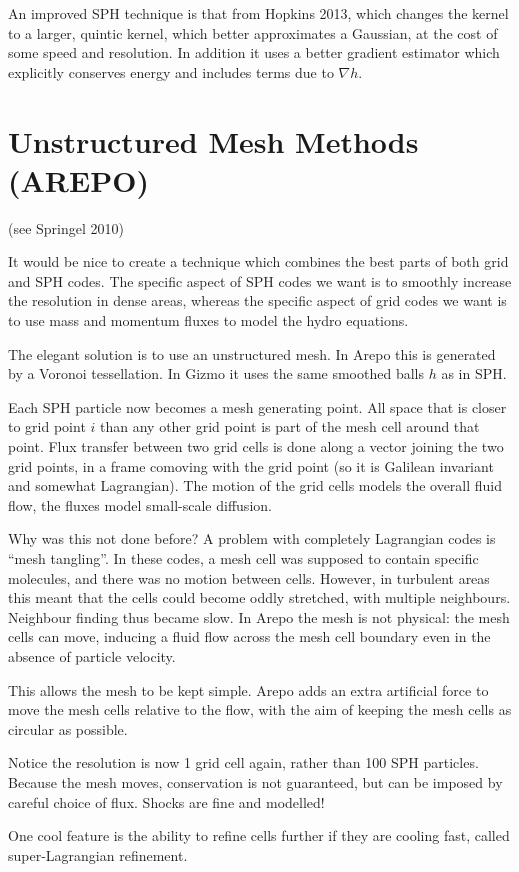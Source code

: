 \documentclass[12pt]{article}
\begin{document}
An improved SPH technique is that from Hopkins 2013, which changes the kernel to a larger, quintic kernel, which better approximates a Gaussian, at the cost of some speed and resolution. In addition it uses a better gradient estimator which explicitly conserves energy and includes terms due to $\nabla h$.

\section{Unstructured Mesh Methods (AREPO)}
(see Springel 2010)

It would be nice to create a technique which combines the best parts of both grid and SPH codes. The specific aspect of SPH codes we want is to smoothly increase the resolution in dense areas, whereas the specific aspect of grid codes we want is to use mass and momentum fluxes to model the hydro equations.

The elegant solution is to use an unstructured mesh. In Arepo this is generated by a Voronoi tessellation. In Gizmo it uses the same smoothed balls $h$ as in SPH.

Each SPH particle now becomes a mesh generating point. All space that is closer to grid point $i$ than any other grid point is part of the mesh cell around that point. Flux transfer between two grid cells is done along a vector joining the two grid points, in a frame comoving with the grid point (so it is Galilean invariant and somewhat Lagrangian).
The motion of the grid cells models the overall fluid flow, the fluxes model small-scale diffusion.

Why was this not done before? A problem with completely Lagrangian codes is ``mesh tangling''. In these codes, a mesh cell was supposed to contain specific molecules, and there was no motion between cells. However, in turbulent areas this meant that the cells could become oddly stretched, with multiple neighbours. Neighbour finding thus became slow. In Arepo the mesh is not physical: the mesh cells can move, inducing a fluid flow across the mesh cell boundary even in the absence of particle velocity.

This allows the mesh to be kept simple. Arepo adds an extra artificial force to move the mesh cells relative to the flow, with the aim of keeping the mesh cells as circular as possible.

Notice the resolution is now 1 grid cell again, rather than 100 SPH particles. Because the mesh moves, conservation is not guaranteed, but can be imposed by careful choice of flux. Shocks are fine and modelled!

One cool feature is the ability to refine cells further if they are cooling fast, called super-Lagrangian refinement.
\end{document}
